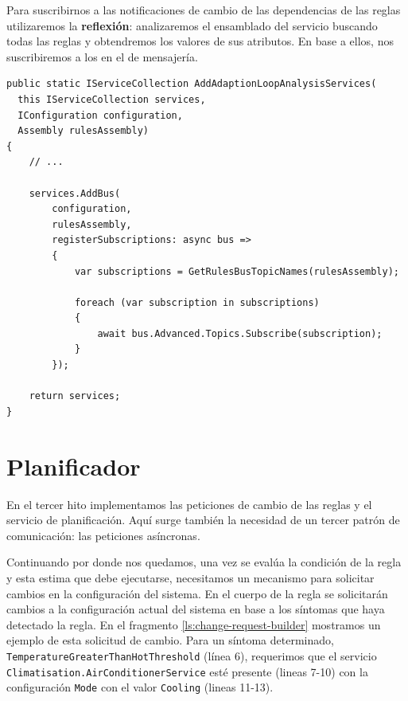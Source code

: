 Para suscribirnos a las notificaciones de cambio de las dependencias de las reglas utilizaremos la \textbf{reflexión}: analizaremos el ensamblado del servicio buscando todas las reglas y obtendremos los valores de sus atributos. En base a ellos, nos suscribiremos a los  en el  de mensajería.

\begin{lstlisting}[language={[Sharp]C},caption={Para suscribirnos a los \foreign{english}{topics} de las notificaciones obtenemos las dependencias de las reglas mediante reflexión},captionpos=b, label=ls:rules-registration]
public static IServiceCollection AddAdaptionLoopAnalysisServices(
  this IServiceCollection services,
  IConfiguration configuration,
  Assembly rulesAssembly)
{
    // ...

    services.AddBus(
        configuration,
        rulesAssembly,
        registerSubscriptions: async bus =>
        {
            var subscriptions = GetRulesBusTopicNames(rulesAssembly);

            foreach (var subscription in subscriptions)
            {
                await bus.Advanced.Topics.Subscribe(subscription);
            }
        });

    return services;
}
\end{lstlisting}

\section{Planificador}

En el tercer hito implementamos las peticiones de cambio de las reglas y el servicio de planificación. Aquí surge también la necesidad de un tercer patrón de comunicación: las peticiones asíncronas.

Continuando por donde nos quedamos, una vez se evalúa la condición de la regla y esta estima que debe ejecutarse, necesitamos un mecanismo para solicitar cambios en la configuración del sistema. En el cuerpo de la regla se solicitarán cambios a la configuración actual del sistema en base a los síntomas que haya detectado la regla. En el fragmento \ref{ls:change-request-builder} mostramos un ejemplo de esta solicitud de cambio. Para un síntoma determinado, \texttt{TemperatureGreaterThanHotThreshold} (línea 6), requerimos que el servicio \texttt{Climatisation.AirConditionerService} esté presente (lineas 7-10) con la configuración \texttt{Mode} con el valor \texttt{Cooling} (lineas 11-13).

